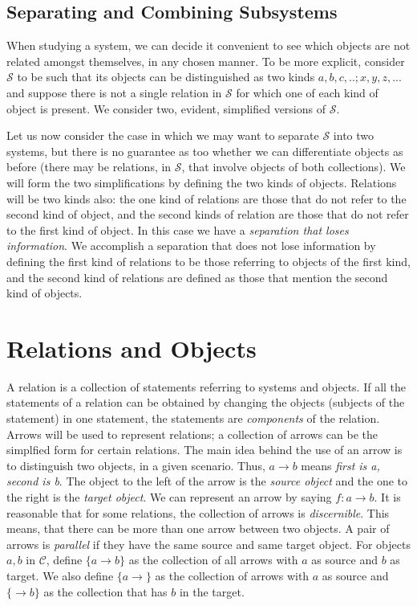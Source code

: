\documentclass [12pt]{book}
\begin{document}
		\subsection{Separating and Combining Subsystems}

When studying a system, we can decide it convenient to see which objects are not related amongst themselves, in any chosen manner. To be more explicit, consider $\mathcal{S}$ to be such that its objects can be distinguished as two kinds $a,b,c,..;x,y,z,...$ and suppose there is not a single relation in $\mathcal{S}$ for which one of each kind of object is present. We consider two, evident, simplified versions of $\mathcal{S}$.

Let us now consider the case in which we may want to separate $\mathcal S$ into two systems, but there is no guarantee as too whether we can differentiate objects as before (there may be relations, in $\mathcal S$, that involve objects of both collections). We will form the two simplifications by defining the two kinds of objects. Relations will be two kinds also: the one kind of relations are those that do not refer to the second kind of object, and the second kinds of relation are those that do not refer to the first kind of object. In this case we have a \textit{separation that loses information}. We accomplish a separation that does not lose information by defining the first kind of relations to be those referring to objects of the first kind, and the second kind of relations are defined as those that mention the second kind of objects.

	\section{Relations and Objects}

A relation is a collection of statements referring to systems and objects. If all the statements of a relation can be obtained by changing the objects (subjects of the statement) in one statement, the statements are \textit{components} of the relation. Arrows will be used to represent relations; a collection of arrows can be the simplfied form for certain relations. The main idea behind the use of an arrow is to distinguish two objects, in a given scenario. Thus, $a\rightarrow b$ means \textit{first is a, second is b}. The object to the left of the arrow is the \textit{source object} and the one to the right is the \textit{target object}. We can represent an arrow by saying $f:a\rightarrow b$. It is reasonable that for some relations, the collection of arrows is \textit{discernible}. This means, that there can be more than one arrow between two objects. A pair of arrows is \textit{parallel} if they have the same source and same target object. For objects $a,b$ in $\mathcal C$, define $\{a\rightarrow b\}$ as the collection of all arrows with $a$ as source and $b$ as target. We also define $\{a\rightarrow\}$ as the collection of arrows with $a$ as source and $\{\rightarrow b\}$ as the collection that has $b$ in the target.
\end{document}
